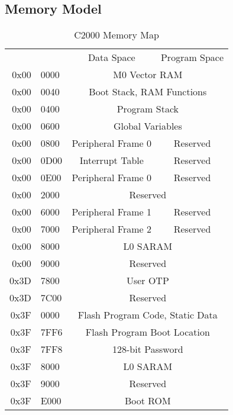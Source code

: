 \subsection{Memory Model}
\begin{wraptable}{r}{8cm}
	\vspace{-18pt}
	\caption{C2000 Memory Map}
	\label{tab:memory-map}
	\centering
	{\footnotesize
	\begin{tabular}{rl|c|c|} 
		\hline\hline
		&& Data Space & Program Space \\ \cline{3-4}
		0x00&0000 & \multicolumn{2}{c|}{M0 Vector RAM} \\ \cline{3-4}
		0x00&0040 & \multicolumn{2}{c|}{Boot Stack, RAM Functions} \\ \cline{3-4}
		0x00&0400 & \multicolumn{2}{c|}{Program Stack} \\ \cline{3-4}
		0x00&0600 & \multicolumn{2}{c|}{Global Variables} \\ \cline{3-4}
		0x00&0800 & Peripheral Frame 0 & Reserved \\ \cline{3-4}
		0x00&0D00 & Interrupt Table & Reserved \\ \cline{3-4}
		0x00&0E00 & Peripheral Frame 0 & Reserved \\ \cline{3-4}
		0x00&2000 & \multicolumn{2}{c|}{Reserved} \\ \cline{3-4}
		0x00&6000 & Peripheral Frame 1 & Reserved \\ \cline{3-4}
		0x00&7000 & Peripheral Frame 2 & Reserved \\ \cline{3-4}
		0x00&8000 & \multicolumn{2}{c|}{L0 SARAM} \\ \cline{3-4}
		0x00&9000 & \multicolumn{2}{c|}{Reserved} \\ \cline{3-4}
		0x3D&7800 & \multicolumn{2}{c|}{User OTP} \\ \cline{3-4}
		0x3D&7C00 & \multicolumn{2}{c|}{Reserved} \\ \cline{3-4}
		0x3F&0000 & \multicolumn{2}{c|}{Flash Program Code, Static Data} \\ \cline{3-4}
		0x3F&7FF6 & \multicolumn{2}{c|}{Flash Program Boot Location} \\ \cline{3-4}
		0x3F&7FF8 & \multicolumn{2}{c|}{128-bit Password} \\ \cline{3-4}
		0x3F&8000 & \multicolumn{2}{c|}{L0 SARAM} \\ \cline{3-4}
		0x3F&9000 & \multicolumn{2}{c|}{Reserved} \\ \cline{3-4}
		0x3F&E000 & \multicolumn{2}{c|}{Boot ROM} \\ \cline{3-4}
		\hline
	\end{tabular}
	}
\end{wraptable}
